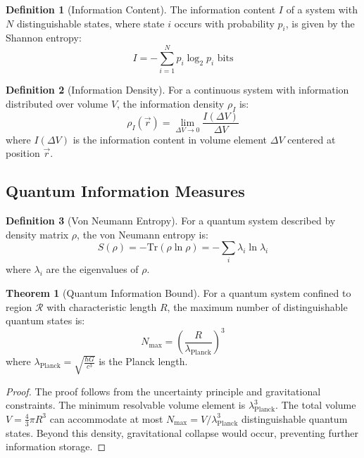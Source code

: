 \documentclass[11pt,a4paper]{article}
\theoremstyle{definition}
\newtheorem{definition}{Definition}[section]
\newtheorem{theorem}{Theorem}[section]
\begin{document}
\begin{definition}[Information Content]
The information content $I$ of a system with $N$ distinguishable states, where state $i$ occurs with probability $p_i$, is given by the Shannon entropy:
\begin{equation}
I = -\sum_{i=1}^{N} p_i \log_2 p_i \text{ bits}
\end{equation}
\end{definition}

\begin{definition}[Information Density]
For a continuous system with information distributed over volume $V$, the information density $\rho_I$ is:
\begin{equation}
\rho_I(\vec{r}) = \lim_{\Delta V \to 0} \frac{I(\Delta V)}{\Delta V}
\end{equation}
where $I(\Delta V)$ is the information content in volume element $\Delta V$ centered at position $\vec{r}$.
\end{definition}

\subsection{Quantum Information Measures}

\begin{definition}[Von Neumann Entropy]
For a quantum system described by density matrix $\rho$, the von Neumann entropy is:
\begin{equation}
S(\rho) = -\text{Tr}(\rho \ln \rho) = -\sum_i \lambda_i \ln \lambda_i
\end{equation}
where $\lambda_i$ are the eigenvalues of $\rho$.
\end{definition}

\begin{theorem}[Quantum Information Bound]
For a quantum system confined to region $\mathcal{R}$ with characteristic length $R$, the maximum number of distinguishable quantum states is:
\begin{equation}
N_{\text{max}} = \left(\frac{R}{\lambda_{\text{Planck}}}\right)^3
\end{equation}
where $\lambda_{\text{Planck}} = \sqrt{\frac{\hbar G}{c^3}}$ is the Planck length.
\end{theorem}

\begin{proof}
The proof follows from the uncertainty principle and gravitational constraints. The minimum resolvable volume element is $\lambda_{\text{Planck}}^3$. The total volume $V = \frac{4}{3}\pi R^3$ can accommodate at most $N_{\text{max}} = V/\lambda_{\text{Planck}}^3$ distinguishable quantum states. Beyond this density, gravitational collapse would occur, preventing further information storage.
\end{proof}
\end{document}
